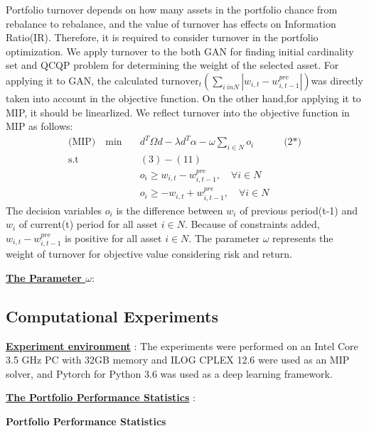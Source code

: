 \documentclass[11pt]{article}
\begin{document}
	Portfolio turnover depends on how many assets in the portfolio chance from rebalance to rebalance, and the value of turnover has effects on Information Ratio(IR). Therefore, it is required to consider turnover in the portfolio optimization. We apply turnover to the both GAN for finding initial cardinality set and QCQP problem for determining the weight of the selected asset. For applying it to GAN, the calculated $\text{turnover}_{t} (\sum_{i \ inN}|w_{i,t}-w_{i,t-1}^{pre}|)$was directly taken into account in the objective function. On the other hand,for applying it to MIP, it should be linearlized. We reflect turnover into the objective function in MIP as follows: 
	\begin{align*}
	\text{(MIP)} \quad \min \quad & d^T\Omega d  -  \lambda d^{T}\alpha - \omega \sum_{i \in N}o_i \quad  \quad \quad\text{(2*)}\\
	\text{s.t } \quad & (3) - (11)\\
	& o_i \geq w_{i,t}-w_{i,t-1}^{pre}, \quad \forall{i \in N} \\
	& o_i \geq -w_{i,t}+w_{i,t-1}^{pre}, \quad \forall{i \in N} 
	\end{align*}
	The decision variables $o_i$ is the difference between $w_i$ of previous period(t-1) and $w_i$ of current(t) period for all asset $i \in N$. Because of constraints added, $ w_{i,t}-w_{i,t-1}^{pre}$ is positive for all asset $i \in N$. The parameter $\omega$ represents the weight of turnover for objective value considering risk and return. 
	
	\underline{\textbf{The Parameter $ \omega$}}: 
	
	\subsection{Computational Experiments}
	
	\underline{\textbf{Experiment environment}} : The experiments were performed on an Intel Core 3.5 GHz PC with 32GB memory and ILOG CPLEX 12.6 were used as an MIP solver, and Pytorch for Python 3.6 was used as a deep learning framework. 
	
	
	\underline{\textbf{The Portfolio Performance Statistics}} : 
	\begin{center}
		\textbf{Portfolio Performance Statistics}\vspace*{-14pt}
	\end{center}
	
\end{document}
